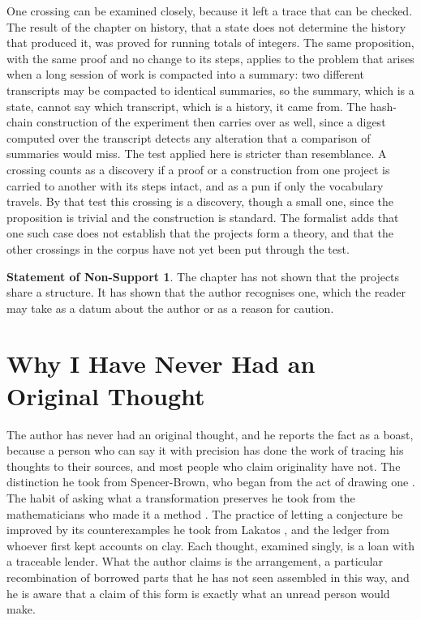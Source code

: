 \documentclass[11pt,openany,twoside]{book}
\theoremstyle{plain}
\theoremstyle{definition}
\newtheorem{nonsupport}{Statement of Non-Support}
\theoremstyle{remark}
\begin{document}
One crossing can be examined closely, because it left a trace that can be checked. The result of the chapter on history, that a state does not determine the history that produced it, was proved for running totals of integers. The same proposition, with the same proof and no change to its steps, applies to the problem that arises when a long session of work is compacted into a summary: two different transcripts may be compacted to identical summaries, so the summary, which is a state, cannot say which transcript, which is a history, it came from. The hash-chain construction of the experiment then carries over as well, since a digest computed over the transcript detects any alteration that a comparison of summaries would miss. The test applied here is stricter than resemblance. A crossing counts as a discovery if a proof or a construction from one project is carried to another with its steps intact, and as a pun if only the vocabulary travels. By that test this crossing is a discovery, though a small one, since the proposition is trivial and the construction is standard. The formalist adds that one such case does not establish that the projects form a theory, and that the other crossings in the corpus have not yet been put through the test.

\begin{nonsupport}
The chapter has not shown that the projects share a structure. It has shown that the author recognises one, which the reader may take as a datum about the author or as a reason for caution.
\end{nonsupport}

\chapter{Why I Have Never Had an Original Thought}

The author has never had an original thought, and he reports the fact as a boast, because a person who can say it with precision has done the work of tracing his thoughts to their sources, and most people who claim originality have not. The distinction he took from Spencer-Brown, who began from the act of drawing one \cite{spencerbrown-laws}. The habit of asking what a transformation preserves he took from the mathematicians who made it a method \cite{maclane-categories}. The practice of letting a conjecture be improved by its counterexamples he took from Lakatos \cite{lakatos-proofs}, and the ledger from whoever first kept accounts on clay. Each thought, examined singly, is a loan with a traceable lender. What the author claims is the arrangement, a particular recombination of borrowed parts that he has not seen assembled in this way, and he is aware that a claim of this form is exactly what an unread person would make.
\end{document}
